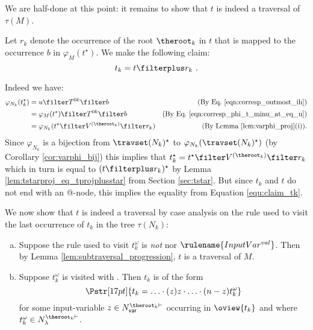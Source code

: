 \begin{itemize}[$\bullet$]
\begin{enumerate}
\begin{itemize}
        We are half-done at this point: it remains to show that $t$ is indeed a traversal of $\tau(M)$.

        Let $r_k$ denote the occurrence of the root
        $\theroot_k$ in $t$ that is mapped to the
        occurrence $b$ in $\varphi_{M}(t^\star)$. We make the following claim:
        \begin{equation}
            t_k = t \filterplus r_k \ . \label{equ:claim_tk}
        \end{equation}

        Indeed we have:
        \begin{align*}
        \varphi_{N_k}(t_k^\star) &= u \filter T^{0k}\filter b
            & \mbox{(By Eq.\ \ref{eqn:corresp_outmost_ih})} \\
         &= \varphi_{M}(t^\star) \filter T^{0k}\filter b
            & \mbox{(By Eq.\ \ref{eqn:corresp_phi_t_minu_at_eq_u})} \\
         &= \varphi_{N_k}(t^\star \filter V^{(\theroot_k)} \filter r_k )
            & \mbox{(By Lemma \ref{lem:varphi_proj}(i)).}
        \end{align*}
        Since $\varphi_{N_k}$ is a bijection from  $\travset(N_k)^\star$ to $\varphi_{N_k}(\travset(N_k)^\star )$ (by Corollary \ref{cor:varphi_bij}) this implies that  $t_k^\star = t^\star \filter V^{(\theroot_k)} \filter r_k$ which in turn is equal to $(t\filterplus r_k)^\star$ by Lemma \ref{lem:tstarproj_eq_tprojplusstar} from Section \ref{sec:tstar}. But since $t_k$ and $t$ do not end with an @-node, this implies the equality from Equation \ref{equ:claim_tk}.
    \smallskip

    We now show that $t$ is indeed a traversal by case analysis on the rule used to visit the last occurrence of $t_k$ in the tree $\tau(N_k)$:
    \begin{enumerate}[(a)]
    \item  Suppose the rule used to visit $t_k^\omega$ is \emph{not}  nor $\rulename{InputVar^{val}}$.
        Then by Lemma \ref{lem:subtraversal_progression}, $t$ is a traversal of $M$.

    \item Suppose $t_k^\omega$ is visited with . Then $t_k$ is of the form
        $$\Pstr[17pt]{ t_k = \ldots \cdot (z)z \cdot \ldots \cdot (n-z){t_k^\omega}}$$
        for some input-variable $z \in
        N^{\theroot_k\vdash}_{\sf var}$ occurring in
        $\oview{t_k}$ and where $t_k^\omega \in N_\lambda^{\theroot_k\vdash}$.



\end{enumerate}
\end{itemize}
\end{enumerate}
\end{itemize}
